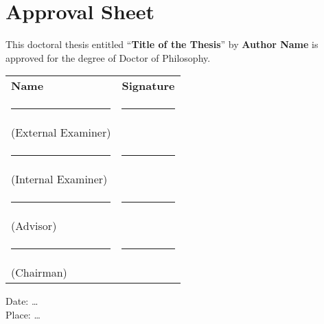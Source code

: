 
\chapter*{Approval Sheet}

This doctoral thesis entitled ``\textbf{Title of the Thesis}'' by \textbf{Author Name} is approved for the degree of Doctor of Philosophy.

\vspace{3cm}
\renewcommand{\arraystretch}{1.5}
\begin{tabular}{p{10cm}l}
	\textbf{Name}           & \textbf{Signature} \\
	
	\rule{10em}{.4pt}       & \rule{10em}{.4pt} \\[-3mm]	
	(External Examiner)     & \\
	
	\rule{10em}{.4pt}       & \rule{10em}{.4pt} \\[-3mm]	
	(Internal Examiner)     & \\
	
	\rule{10em}{.4pt}       & \rule{10em}{.4pt} \\[-3mm]	
	(Advisor)               & \\
	
	\rule{10em}{.4pt}       & \rule{10em}{.4pt} \\[-3mm]	
	(Chairman)              & \\
\end{tabular}

\vspace{2cm}
\noindent 
Date: \ldots\\
Place: \ldots









